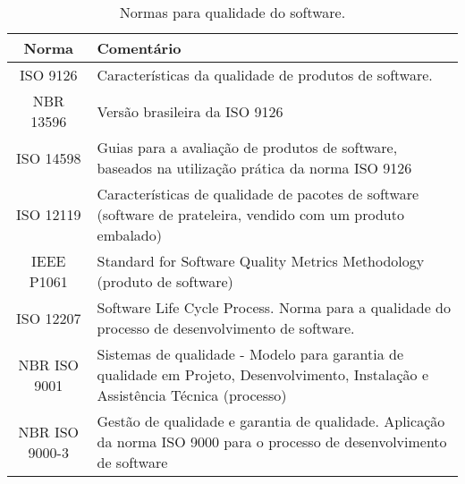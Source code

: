 \begin{table}[H]
    \centering
    \caption[Normas para qualidade do software]{Normas para qualidade do software.\label{tab:NormasSoftware}}
    \begin{tabular}{|cp{8cm}|}
        \hline
            Norma  & Comentário  \\
        \hline
            \vspace*{0,15cm} ISO 9126 & Características da qualidade de produtos de software. \vspace*{0,15cm}\\ \hline
           
            \vspace*{0,15cm} NBR 13596 & Versão brasileira da ISO 9126 \vspace*{0,15cm}\\ \hline
            
            \vspace*{0,15cm} ISO 14598 & Guias para a 
            avaliação de produtos de software, 
            baseados na utilização prática da norma ISO 9126 \vspace*{0,15cm}\\ \hline
           
            \vspace*{0,15cm} ISO 12119 & Características de qualidade de pacotes de software (software de
prateleira, vendido com um produto embalado)
 \vspace*{0,15cm}\\ \hline
			
			
			\vspace*{0,15cm} IEEE P1061 & Standard for Software Quality Metrics Methodology (produto de
software)
 \vspace*{0,15cm}\\ \hline
			\vspace*{0,15cm} ISO 12207 & Software Life Cycle Process. Norma para a qualidade do processo de desenvolvimento de software. \vspace*{0,15cm}\\ \hline
			
			
			\vspace*{0,15cm} NBR ISO 9001  & Sistemas de qualidade - Modelo para garantia de qualidade em Projeto,
Desenvolvimento, Instalação e Assistência Técnica (processo) \vspace*{0,15cm}\\ \hline	
            
            
            \vspace*{0,15cm} NBR ISO 9000-3 & Gestão de qualidade e garantia de qualidade. Aplicação da norma ISO
9000 para o processo de desenvolvimento de software \vspace*{0,15cm}\\ \hline
			

\end{tabular}
\end{table}
